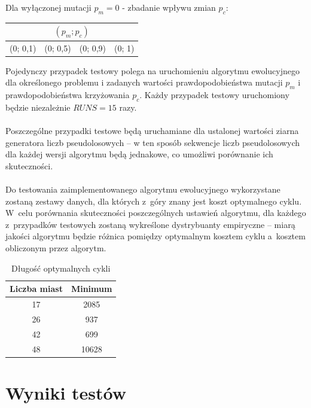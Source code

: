 \documentclass[12pt, a4paper]{article}
\begin{document}
\bigskip

Dla wyłączonej mutacji $p_m = 0$ - zbadanie wpływu zmian $p_c$:
\begin{center}
\begin{tabular}{|l|l|l|l|}
\hline
\multicolumn{4}{|c|}{$(p_m; p_c)$} \\
\hline
(0; 0,1) & (0; 0,5) & (0; 0,9) & (0; 1)\\
\hline
\end{tabular}
\end{center}

\bigskip

Pojedynczy przypadek testowy polega na uruchomieniu algorytmu ewolucyjnego dla określonego 
problemu i zadanych wartości prawdopodobieństwa mutacji $p_m$ i prawdopodobieństwa 
krzyżowania $p_c$. Każdy przypadek testowy uruchomiony będzie niezależnie $RUNS = 15$ razy.\\
\\
Poszczególne przypadki testowe będą uruchamiane dla ustalonej wartości ziarna generatora 
liczb pseudolosowych -- w ten sposób sekwencje liczb pseudolosowych dla każdej wersji 
algorytmu będą jednakowe, co umożliwi porównanie ich skuteczności.\\
\\
Do testowania zaimplementowanego algorytmu ewolucyjnego wykorzystane zostaną zestawy danych,
dla których z~góry znany jest koszt optymalnego cyklu. W~celu porównania skuteczności 
poszczególnych ustawień algorytmu, dla każdego z~przypadków testowych zostaną wykreślone 
dystrybuanty empiryczne -- miarą jakości algorytmu będzie różnica pomiędzy optymalnym 
kosztem cyklu a~kosztem obliczonym przez algorytm.

\begin{table}[h]
  \centering
  \begin{tabular}{ | c | c | }
    \hline
    Liczba miast & Minimum\\
    \hline
    17 & 2085\\
    \hline
    26 & 937\\
    \hline
    42 & 699\\
    \hline
    48 & 10628\\
    \hline
  \end{tabular}
  \caption{Długość optymalnych cykli}
\end{table}

\section{Wyniki testów}
\end{document}
